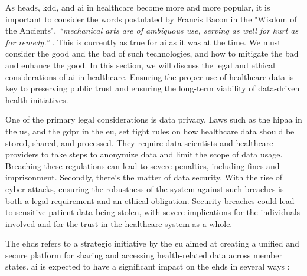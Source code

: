 
As \ac{heads}, \ac{kdd}, and \ac{ai} in healthcare become more and more popular, it is important to consider the words postulated by Francis Bacon in the "Wisdom of the Ancients", \textit{“mechanical arts are of ambiguous use, serving as well for hurt as for remedy.”} \cite{bacon_2011}. This is currently as true for \ac{ai} as it was at the time. We must consider the good and the bad of such technologies, and how to mitigate the bad and enhance the good. In this section, we will discuss the legal and ethical considerations of \ac{ai} in healthcare. Ensuring the proper use of healthcare data is key to preserving public trust and ensuring the long-term viability of data-driven health initiatives.


One of the primary legal considerations is data privacy. Laws such as the \ac{hipaa} in the \ac{us}, and the \ac{gdpr} in the \ac{eu}, set tight rules on how healthcare data should be stored, shared, and processed. They require data scientists and healthcare providers to take steps to anonymize data and limit the scope of data usage. Breaching these regulations can lead to severe penalties, including fines and imprisonment.
Secondly, there's the matter of data security. With the rise of cyber-attacks, ensuring the robustness of the system against such breaches is both a legal requirement and an ethical obligation. Security breaches could lead to sensitive patient data being stolen, with severe implications for the individuals involved and for the trust in the healthcare system as a whole.


The \ac{ehds} refers to a strategic initiative by the \ac{eu} aimed at creating a unified and secure platform for sharing and accessing health-related data across member states. \ac{ai} is expected to have a significant impact on the \ac{ehds} in several ways \cite{ehds}:

